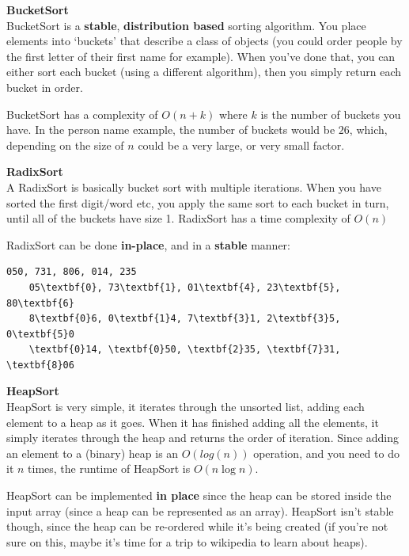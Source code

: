 \begin{description}
\item \textbf{BucketSort} \\
  BucketSort is a \textbf{stable}, \textbf{distribution based} sorting
  algorithm. You place elements into `buckets' that describe a class of objects
  (you could order people by the first letter of their first name for example).
  When you've done that, you can either sort each bucket (using a different
  algorithm), then you simply return each bucket in order.

  BucketSort has a complexity of $O(n + k)$ where $k$ is the number of buckets
  you have. In the person name example, the number of buckets would be $26$,
  which, depending on the size of $n$ could be a very large, or very small
  factor.

\item \textbf{RadixSort}\\
  A RadixSort is basically bucket sort with multiple iterations. When you have
  sorted the first digit/word etc, you apply the same sort to each bucket in
  turn, until all of the buckets have size 1. RadixSort has a time complexity of
  $O(n)$

  RadixSort can be done \textbf{in-place}, and in a \textbf{stable} manner:
  \begin{Verbatim}[commandchars=\\\{\},codes={\catcode`$=3\catcode`_=8}]
    050, 731, 806, 014, 235
    05\textbf{0}, 73\textbf{1}, 01\textbf{4}, 23\textbf{5}, 80\textbf{6}
    8\textbf{0}6, 0\textbf{1}4, 7\textbf{3}1, 2\textbf{3}5, 0\textbf{5}0
    \textbf{0}14, \textbf{0}50, \textbf{2}35, \textbf{7}31, \textbf{8}06
  \end{Verbatim}

\item \textbf{HeapSort} \\
  HeapSort is very simple, it iterates through the unsorted list, adding each
  element to a heap as it goes. When it has finished adding all the elements, it
  simply iterates through the heap and returns the order of iteration. Since
  adding an element to a (binary) heap is an $O(log(n))$ operation, and you need
  to do it $n$ times, the runtime of HeapSort is $O(n\log{n})$.

  HeapSort can be implemented \textbf{in place} since the heap can be stored
  inside the input array (since a heap can be represented as an array). HeapSort
  isn't stable though, since the heap can be re-ordered while it's being created
  (if you're not sure on this, maybe it's time for a trip to wikipedia to learn
  about heaps).

\end{description}

